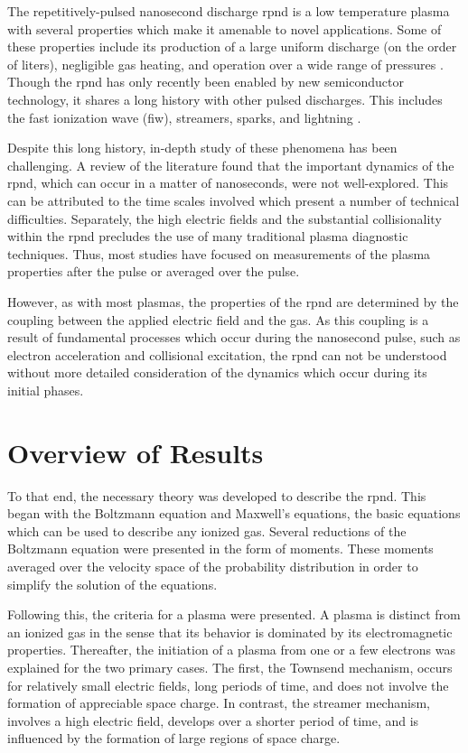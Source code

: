 The repetitively-pulsed nanosecond discharge \acs{rpnd} is a low temperature
plasma with several properties which make it amenable to novel applications.
Some of these properties include its production of a large uniform discharge (on
the order of liters), negligible gas heating, and operation over a wide range of
pressures \cite{Starikovskaia2001}. Though the \acs{rpnd} has only recently been
enabled by new semiconductor technology, it shares a long history with other
pulsed discharges. This includes the fast ionization wave (\acs{fiw}),
streamers, sparks, and lightning \cite{Loeb1965}.

Despite this long history, in-depth study of these phenomena has been
challenging. A review of the literature found that the important dynamics of the
\acs{rpnd}, which can occur in a matter of nanoseconds, were not well-explored.
This can be attributed to the time scales involved which present a number of
technical difficulties. Separately, the high electric fields and the substantial
collisionality within the \acs{rpnd} precludes the use of many traditional
plasma diagnostic techniques. Thus, most studies have focused on measurements of
the plasma properties after the pulse or averaged over the pulse.

However, as with most plasmas, the properties of the \acs{rpnd} are determined
by the coupling between the applied electric field and the gas. As this coupling
is a result of fundamental processes which occur during the nanosecond pulse,
such as electron acceleration and collisional excitation, the \acs{rpnd} can not
be understood without more detailed consideration of the dynamics which occur
during its initial phases.

\section{Overview of Results}

To that end, the necessary theory was developed to describe the \acs{rpnd}. This
began with the Boltzmann equation and Maxwell's equations, the basic equations
which can be used to describe any ionized gas. Several reductions of the
Boltzmann equation were presented in the form of moments. These moments averaged
over the velocity space of the probability distribution in order to simplify the
solution of the equations.

Following this, the criteria for a plasma were presented. A plasma is distinct
from an ionized gas in the sense that its behavior is dominated by its
electromagnetic properties. Thereafter, the initiation of a plasma from one or a
few electrons was explained for the two primary cases. The first, the Townsend
mechanism, occurs for relatively small electric fields, long periods of time,
and does not involve the formation of appreciable space charge. In contrast, the
streamer mechanism, involves a high electric field, develops over a shorter
period of time, and is influenced by the formation of large regions of space
charge.

